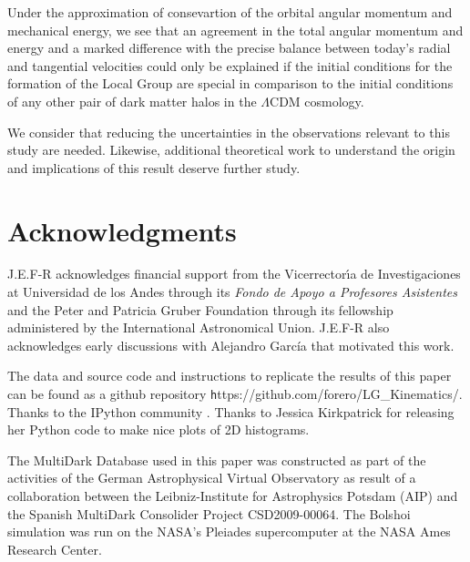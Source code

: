 \documentclass{emulateapj}
\begin{document}
Under the approximation of consevartion of the orbital angular
momentum and mechanical energy, we see that an agreement in the total
angular momentum and energy and a marked difference with the precise
balance between today's radial and tangential velocities could only be
explained if the initial conditions for the formation of the Local
Group are special in comparison to the initial conditions of any other
pair of dark matter halos in the $\Lambda$CDM cosmology.  

We consider that reducing the uncertainties in the observations
relevant to this study are needed. Likewise, additional theoretical
work to understand the origin and implications of this result deserve
further study. 

\label{sec:conclusions}
\section*{Acknowledgments}  
J.E.F-R acknowledges financial support from the Vicerrector\'{\i}a de
Investigaciones at Universidad de los Andes through its {\it Fondo de
  Apoyo a Profesores Asistentes} and the Peter and Patricia Gruber
Foundation through its fellowship administered by the International
Astronomical Union. J.E.F-R also acknowledges early discussions with
Alejandro Garc\'ia that motivated this work. 

The data and source code and instructions to replicate the results of
this paper can be found as a github repository {\texttt
  https://github.com/forero/LG\_Kinematics/}. Thanks to the IPython
community \citep{IPython}. Thanks to Jessica Kirkpatrick for releasing
her Python code to make nice plots of 2D histograms.  

The MultiDark Database used in this paper  was constructed as part of
the activities of the German Astrophysical Virtual Observatory as
result of a collaboration between the Leibniz-Institute for
Astrophysics Potsdam (AIP) and the Spanish MultiDark Consolider
Project CSD2009-00064. The Bolshoi simulation was run on the NASA's
Pleiades supercomputer at the NASA Ames Research Center. 



 
\end{document}
